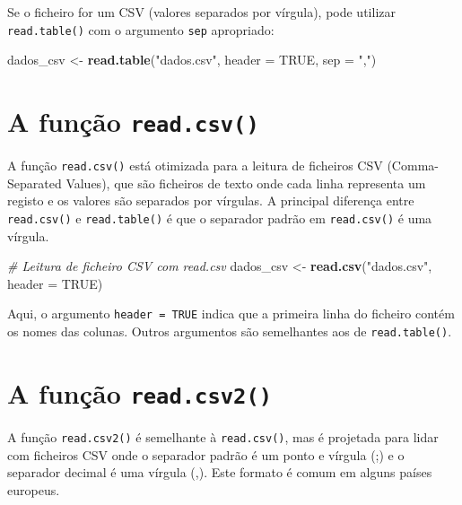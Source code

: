 \documentclass[
]{book}
\newenvironment{Shaded}{\begin{snugshade}}{\end{snugshade}}
\newcommand{\AttributeTok}[1]{\textcolor[rgb]{0.13,0.29,0.53}{#1}}
\newcommand{\CommentTok}[1]{\textcolor[rgb]{0.56,0.35,0.01}{\textit{#1}}}
\newcommand{\ConstantTok}[1]{\textcolor[rgb]{0.56,0.35,0.01}{#1}}
\newcommand{\FunctionTok}[1]{\textcolor[rgb]{0.13,0.29,0.53}{\textbf{#1}}}
\newcommand{\NormalTok}[1]{#1}
\newcommand{\OtherTok}[1]{\textcolor[rgb]{0.56,0.35,0.01}{#1}}
\newcommand{\StringTok}[1]{\textcolor[rgb]{0.31,0.60,0.02}{#1}}
\begin{document}
Se o ficheiro for um CSV (valores separados por vírgula), pode utilizar
\texttt{read.table()} com o argumento \texttt{sep} apropriado:

\begin{Shaded}
\begin{Highlighting}[]
\NormalTok{dados\_csv }\OtherTok{\textless{}{-}} \FunctionTok{read.table}\NormalTok{(}\StringTok{"dados.csv"}\NormalTok{, }\AttributeTok{header =} \ConstantTok{TRUE}\NormalTok{, }\AttributeTok{sep =} \StringTok{","}\NormalTok{)}
\end{Highlighting}
\end{Shaded}

\section{\texorpdfstring{A função \texttt{read.csv()}}{A função read.csv()}}\label{a-funuxe7uxe3o-read.csv}

A função \texttt{read.csv()} está otimizada para a leitura de ficheiros CSV
(Comma-Separated Values), que são ficheiros de texto onde cada linha
representa um registo e os valores são separados por vírgulas. A
principal diferença entre \texttt{read.csv()} e \texttt{read.table()} é que o
separador padrão em \texttt{read.csv()} é uma vírgula.

\begin{Shaded}
\begin{Highlighting}[]
\CommentTok{\# Leitura de ficheiro CSV com read.csv}
\NormalTok{dados\_csv }\OtherTok{\textless{}{-}} \FunctionTok{read.csv}\NormalTok{(}\StringTok{"dados.csv"}\NormalTok{, }\AttributeTok{header =} \ConstantTok{TRUE}\NormalTok{)}
\end{Highlighting}
\end{Shaded}

Aqui, o argumento \texttt{header\ =\ TRUE} indica que a primeira linha do
ficheiro contém os nomes das colunas. Outros argumentos são semelhantes
aos de \texttt{read.table()}.

\section{\texorpdfstring{A função \texttt{read.csv2()}}{A função read.csv2()}}\label{a-funuxe7uxe3o-read.csv2}

A função \texttt{read.csv2()} é semelhante à \texttt{read.csv()}, mas é projetada para
lidar com ficheiros CSV onde o separador padrão é um ponto e vírgula (;)
e o separador decimal é uma vírgula (,). Este formato é comum em alguns
países europeus.
\end{document}
